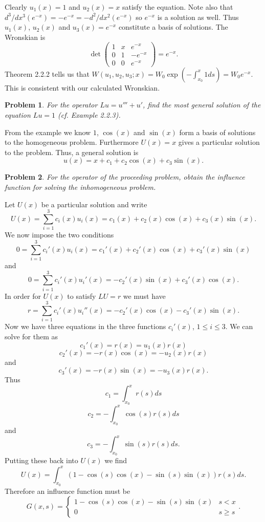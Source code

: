 \documentclass{article}
\newtheorem{problem}{Problem}
\begin{document}
Clearly $u_1(x) = 1$ and $u_2(x) = x$ satisfy the equation. Note also that $d^3/dx^3 (e^{-x}) = -e^{-x} = -d^2/dx^2 (e^{-x})$ so $e^{-x}$ is a solution as well. Thus $u_1(x)$, $u_2(x)$ and $u_3(x) = e^{-x}$ constitute a basis of solutions. The Wronskian is
\[
\det \left (
\begin{array}{ccc}
1 & x & e^{-x}\\
0 & 1 & -e^{-x}\\
0 & 0 & e^{-x}
\end{array}
\right )
= e^{-x}.
\]
Theorem 2.2.2 tells us that $W(u_1, u_2, u_3; x) = W_0 \exp \left ( -\int_{x_0}^x 1 ds \right ) = W_0e^{-x}$. This is consistent with our calculated Wronskian.

\begin{problem}
For the operator $Lu = u''' + u'$, find the most general solution of the equation $Lu = 1$ (cf. Example 2.2.3).
\end{problem}

From the example we know $1$, $\cos(x)$ and $\sin(x)$ form a basis of solutions to the homogeneous problem. Furthermore $U(x) = x$ gives a particular solution to the problem. Thus, a general solution is
\[
u(x) = x + c_1 + c_2 \cos(x) + c_3 \sin(x).
\]

\begin{problem}
For the operator of the proceeding problem, obtain the influence function for solving the inhomogeneous problem.
\end{problem}

Let $U(x)$ be a particular solution and write
\[
U(x) = \sum_{i=1}^3 c_i(x) u_i(x) = c_1(x) + c_2(x)\cos(x) + c_3(x)\sin(x).
\]
We now impose the two conditions
\[
0 = \sum_{i=1}^3 c_i'(x) u_i(x) = c_1'(x) + c_2'(x)\cos(x) + c_3'(x)\sin(x)
\]
and
\[
0 = \sum_{i=1}^3 c_i'(x) u_i'(x) = -c_2'(x)\sin(x) + c_3'(x)\cos(x).
\]
In order for $U(x)$ to satisfy $LU = r$ we must have
\[
r = \sum_{i=1}^3 c_i'(x) u_i''(x) = -c_2'(x)\cos(x) - c_3'(x)\sin(x).
\]
Now we have three equations in the three functions $c_i'(x)$, $1 \leq i \leq 3$. We can solve for them as
\[
c_1'(x) = r(x) = u_1(x)r(x)
\]
\[
c_2'(x) = -r(x)\cos(x) = -u_2(x)r(x)
\]
and
\[
c_3'(x) = -r(x)\sin(x) = -u_3(x)r(x).
\]
Thus
\[
c_1 = \int_{x_0}^x r(s)ds
\]
\[
c_2 = -\int_{x_0}^x \cos(s)r(s)ds
\]
and
\[
c_3 = -\int_{x_0}^x \sin(s)r(s)ds.
\]
Putting these back into $U(x)$ we find
\[
U(x) = \int_{x_0}^x (1 - \cos(s)\cos(x) - \sin(s)\sin(x))r(s)ds.
\]
Therefore an influence function must be
\[
G(x,s) =
\begin{cases}
1 - \cos(s)\cos(x) - \sin(s)\sin(x) & s < x\\
0 & s \geq s
\end{cases}.
\]
\end{document}
